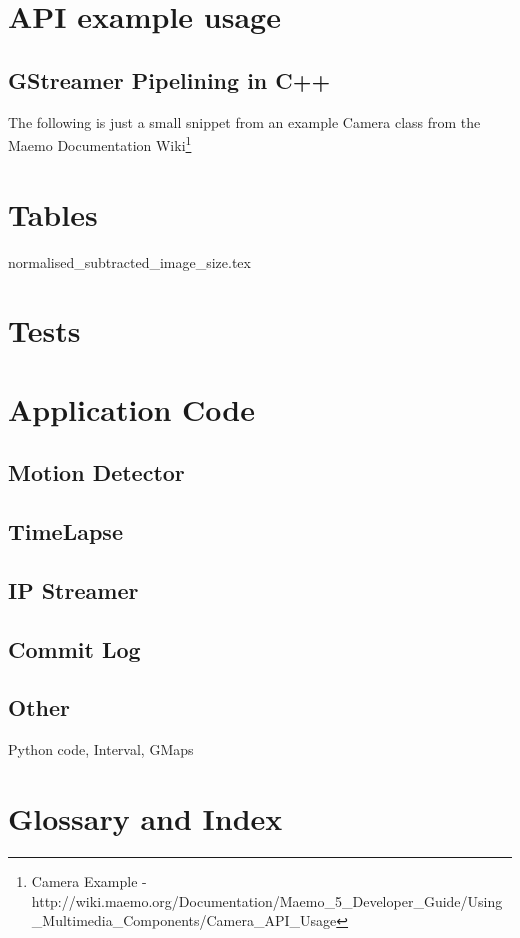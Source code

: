 \section{API example usage}
\subsection{GStreamer Pipelining in C++}
 The following is just a small snippet from an example Camera class from the Maemo Documentation Wiki\footnote{Camera Example - http://wiki.maemo.org/Documentation/Maemo\_5\_Developer\_Guide/Using\_Multimedia\_Components/Camera\_API\_Usage}

\begin{frame}{}
\vspace{-20pt}

\end{frame}

\section{Tables}
{normalised_subtracted_image_size.tex}

\section{Tests}\label{append:tests}


\section{Application Code}
\subsection{Motion Detector}
\subsection{TimeLapse}
\subsection{IP Streamer}
\subsection{Commit Log}
\subsection{Other}{Python code, Interval, GMaps}

\section{Glossary and Index}
